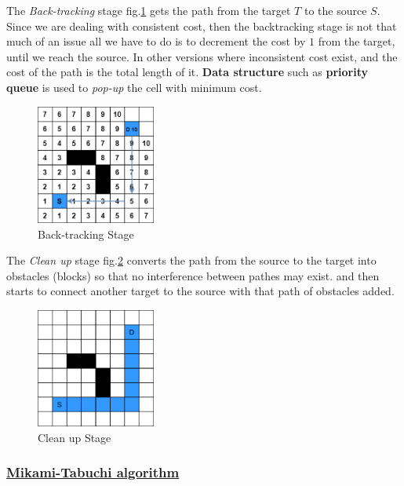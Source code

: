     The \textit{Back-tracking} stage fig.\ref{fig:backtrackingStage} gets the path from the target $T$
    to the source $S$.
    Since we are dealing with consistent cost, then the backtracking stage is not that much of an issue
    all we have to do is to decrement the cost by $1$ from the target, until we reach the source.
    In other versions where inconsistent cost exist, and the cost of the path is the total length of it.
    \textbf{Data structure} such as \textbf{priority queue} is used to \textit{pop-up}
    the cell with minimum cost.

    \begin{figure}[H]
        \centering
        \includegraphics[width=0.35\textwidth]{figures/Lee Stages/back-track.png}
        \caption{Back-tracking Stage}
        \label{fig:backtrackingStage}
    \end{figure}

    The \textit{Clean up} stage fig.\ref{fig:cleanUpStage} converts the path from the source
    to the target into obstacles (blocks) so that no interference between pathes may exist.
    and then starts to connect another target to the source with that path of obstacles added.

    \begin{figure}[H]
        \centering
        \includegraphics[width=0.35\textwidth]{figures/Lee Stages/clean_up.png}
        \caption{Clean up Stage}
        \label{fig:cleanUpStage}
    \end{figure}

    \subsubsection{\underline{Mikami-Tabuchi algorithm}}
    \label{MikamiSection}
    

